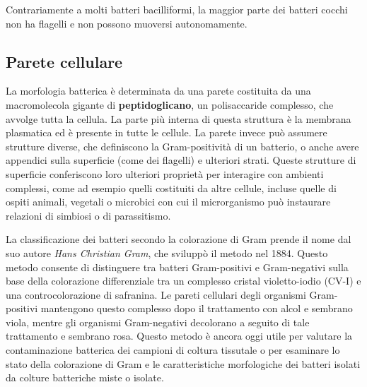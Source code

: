 \documentclass[../main.tex]{subfiles}
\begin{document}
Contrariamente a molti batteri bacilliformi, la maggior parte dei batteri cocchi non ha flagelli e non possono muoversi autonomamente.\cite{levinson_2018}

\subsection{Parete cellulare}

La morfologia batterica è determinata da una parete costituita da una macromolecola gigante di \textbf{peptidoglicano}, un polisaccaride complesso, che avvolge tutta la cellula. La parte più interna di questa struttura è la membrana plasmatica ed è presente in tutte le cellule. La parete invece può assumere strutture diverse, che definiscono la Gram-positività di un batterio, o anche avere appendici sulla superficie (come dei flagelli) e ulteriori strati. Queste strutture di superficie conferiscono loro ulteriori proprietà per interagire con ambienti complessi, come ad esempio quelli costituiti da altre cellule, incluse quelle di ospiti animali, vegetali o microbici con cui il microrganismo può instaurare relazioni di simbiosi o di parassitismo.\cite{smith_1977}

La classificazione dei batteri secondo la colorazione di Gram prende il nome dal suo autore \textit{Hans Christian Gram}, che sviluppò il metodo nel 1884. Questo metodo consente di distinguere tra batteri Gram-positivi e Gram-negativi sulla base della colorazione differenziale tra un complesso cristal violetto-iodio (CV-I) e una controcolorazione di safranina. Le pareti cellulari degli organismi Gram-positivi mantengono questo complesso dopo il trattamento con alcol e sembrano viola, mentre gli organismi Gram-negativi decolorano a seguito di tale trattamento e sembrano rosa. Questo metodo è ancora oggi utile per valutare la contaminazione batterica dei campioni di coltura tissutale o per esaminare lo stato della colorazione di Gram e le caratteristiche morfologiche dei batteri isolati da colture batteriche miste o isolate.\cite{coico_2005}
\end{document}

